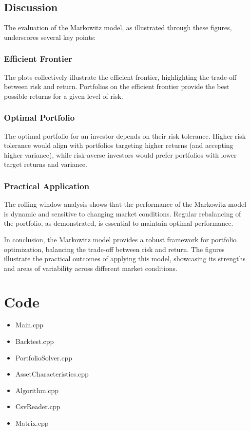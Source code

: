 \documentclass[12pt,twoside]{article}
\begin{document}
\subsection{Discussion}

The evaluation of the Markowitz model, as illustrated through these figures, underscores several key points:

\subsubsection{Efficient Frontier}
The plots collectively illustrate the efficient frontier, highlighting the trade-off between risk and return. Portfolios on the efficient frontier provide the best possible returns for a given level of risk.

\subsubsection{Optimal Portfolio}
The optimal portfolio for an investor depends on their risk tolerance. Higher risk tolerance would align with portfolios targeting higher returns (and accepting higher variance), while risk-averse investors would prefer portfolios with lower target returns and variance.

\subsubsection{Practical Application}
The rolling window analysis shows that the performance of the Markowitz model is dynamic and sensitive to changing market conditions. Regular rebalancing of the portfolio, as demonstrated, is essential to maintain optimal performance.

In conclusion, the Markowitz model provides a robust framework for portfolio optimization, balancing the trade-off between risk and return. The figures illustrate the practical outcomes of applying this model, showcasing its strengths and areas of variability across different market conditions.


\newpage
\section{Code}
\begin{itemize}
    \item Main.cpp
    \item Backtest.cpp
    \item PortfolioSolver.cpp
    \item AssetCharacteristics.cpp
    \item Algorithm.cpp
    \item CsvReader.cpp
    \item Matrix.cpp
\end{itemize}
\end{document}
